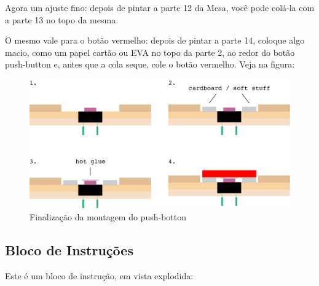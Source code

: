 \documentclass[paper=a4, fontsize=11pt]{scrartcl} %
\numberwithin{equation}{section} %
\numberwithin{figure}{section} %
\numberwithin{table}{section} %
\begin{document}
Agora um ajuste fino: depois de pintar a parte 12 da Mesa, você pode colá-la com a parte 13 no topo da mesma.

O mesmo vale para o botão vermelho: depois de pintar a parte 14, coloque algo macio, como um papel cartão ou EVA no topo da parte 2, ao redor do botão push-button e, antes que a cola seque, cole o botão vermelho. Veja na figura:

\begin{figure}[h] %
  \centering
  \includegraphics[scale=0.15]{./imagens/button-mechanics.jpg}
  \caption[ ]{Finalização da montagem do push-botton }
  \label{fig:push-botton final}
\end{figure}

\subsection{Bloco de Instruções}

Este é um bloco de instrução, em vista explodida:
\end{document}
